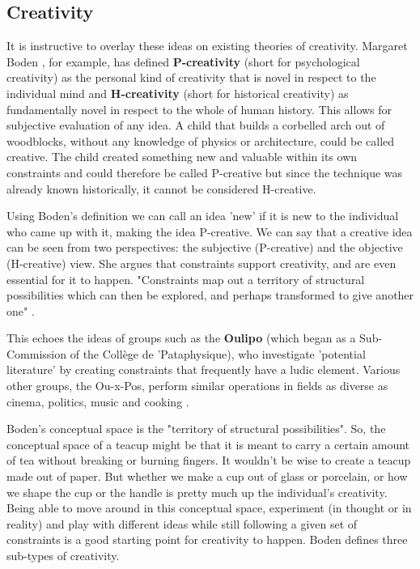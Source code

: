 \subsection{Creativity}

It is instructive to overlay these ideas on existing theories of creativity. Margaret Boden \citep{Boden2003}, for example, has defined \textbf{P-creativity} (short for psychological creativity) as the personal kind of creativity that is novel in respect to the individual mind and \textbf{H-creativity} (short for historical creativity) as fundamentally novel in respect to the whole of human history. This allows for subjective evaluation of any idea. A child that builds a corbelled arch out of woodblocks, without any knowledge of physics or architecture, could be called creative. The child created something new and valuable within its own constraints and could therefore be called P-creative but since the technique was already known historically, it cannot be considered H-creative.

Using Boden's definition we can call an idea 'new' if it is new to the individual who came up with it, making the idea P-creative. We can say that a creative idea can be seen from two perspectives: the subjective (P-creative) and the objective (H-creative) view. She argues that constraints support creativity, and are even essential for it to happen.  "Constraints map out a territory of structural possibilities which can then be explored, and perhaps transformed to give another one" \citep[p.82]{Boden2003}.

This echoes the ideas of groups such as the \textbf{Oulipo} (which began as a Sub-Commission of the Collège de 'Pataphysique), who investigate 'potential literature' by creating constraints that frequently have a ludic element. Various other groups, the Ou-x-Pos, perform similar operations in fields as diverse as cinema, politics, music and cooking \citep{Motte2007}.

Boden's conceptual space is the "territory of structural possibilities". So, the conceptual space of a teacup might be that it is meant to carry a certain amount of tea without breaking or burning fingers. It wouldn't be wise to create a teacup made out of paper. But whether we make a cup out of glass or porcelain, or how we shape the cup or the handle is pretty much up the individual's creativity. Being able to move around in this conceptual space, experiment (in thought or in reality) and play with different ideas while still following a given set of constraints is a good starting point for creativity to happen. Boden defines three sub-types of creativity.

